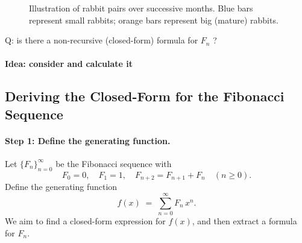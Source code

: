 \documentclass{article}
\begin{document}
\begin{figure}[ht]
  \centering
\caption{Illustration of rabbit pairs over successive months. 
Blue bars represent small rabbits; orange bars represent big (mature) rabbits.}
\end{figure}

Q: is there a non-recursive (closed-form) formula for \(F_n\) ?
\paragraph{Idea: consider and calculate it}

\subsection{Deriving the Closed-Form for the Fibonacci Sequence}

\paragraph{Step 1: Define the generating function.}
Let \(\{F_n\}_{n=0}^{\infty}\) be the Fibonacci sequence with 
\[
F_0 = 0, \quad F_1 = 1, \quad F_{n+2} = F_{n+1} + F_n \quad (n \ge 0).
\]
Define the generating function
\[
f(x) \;=\; \sum_{n=0}^{\infty} F_n\,x^n.
\]
We aim to find a closed-form expression for \(f(x)\), and then extract a formula for \(F_n\).
\end{document}
